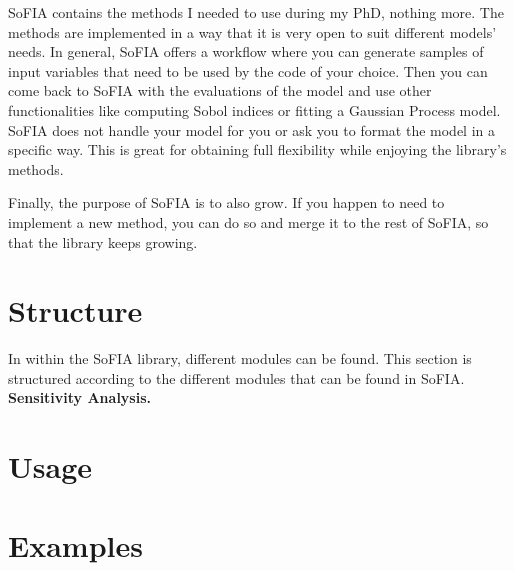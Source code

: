 \documentclass[12pt]{article}
\begin{document}
SoFIA contains the methods I needed to use during my PhD, nothing more. The methods are implemented in a way that it is very open to suit different models' needs. In general, SoFIA offers a workflow where you can generate samples of input variables that need to be used by the code of your choice. Then you can come back to SoFIA with the evaluations of the model and use other functionalities like computing Sobol indices or fitting a Gaussian Process model. SoFIA does not handle your model for you or ask you to format the model in a specific way. This is great for obtaining full flexibility while enjoying the library's methods.

Finally, the purpose of SoFIA is to also grow. If you happen to need to implement a new method, you can do so and merge it to the rest of SoFIA, so that the library keeps growing.

\section{Structure}

In within the SoFIA library, different modules can be found. This section is structured according to the different modules that can be found in SoFIA.\\

\noindent\textbf{Sensitivity Analysis.}

\section{Usage}

\section{Examples}
\end{document}
